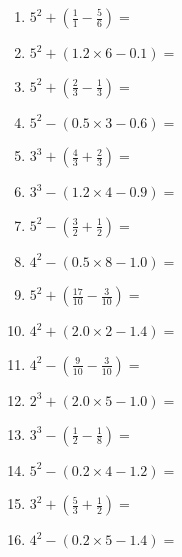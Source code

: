 \documentclass[12pt]{article}
\begin{document}
\begin{enumerate}
\item \large $ 5^{2} + (\frac{1}{1} - \frac{5}{6}) = $ \vspace{1.6cm}
\item \large $ 5^{2} + (1.2 \times 6 - 0.1) = $ \vspace{1.6cm}
\item \large $ 5^{2} + (\frac{2}{3} - \frac{1}{3}) = $ \vspace{1.6cm}
\item \large $ 5^{2} - (0.5 \times 3 - 0.6) = $ \vspace{1.6cm}
\item \large $ 3^{3} + (\frac{4}{3} + \frac{2}{3}) = $ \vspace{1.6cm}
\item \large $ 3^{3} - (1.2 \times 4 - 0.9) = $ \vspace{1.6cm}
\newpage
\item \large $ 5^{2} - (\frac{3}{2} + \frac{1}{2}) = $ \vspace{1.6cm}
\item \large $ 4^{2} - (0.5 \times 8 - 1.0) = $ \vspace{1.6cm}
\item \large $ 5^{2} + (\frac{17}{10} - \frac{3}{10}) = $ \vspace{1.6cm}
\item \large $ 4^{2} + (2.0 \times 2 - 1.4) = $ \vspace{1.6cm}
\item \large $ 4^{2} - (\frac{9}{10} - \frac{3}{10}) = $ \vspace{1.6cm}
\item \large $ 2^{3} + (2.0 \times 5 - 1.0) = $ \vspace{1.6cm}
\item \large $ 3^{3} - (\frac{1}{2} - \frac{1}{8}) = $ \vspace{1.6cm}
\item \large $ 5^{2} - (0.2 \times 4 - 1.2) = $ \vspace{1.6cm}
\item \large $ 3^{2} + (\frac{5}{3} + \frac{1}{2}) = $ \vspace{1.6cm}
\item \large $ 4^{2} - (0.2 \times 5 - 1.4) = $ \vspace{1.6cm}
\end{enumerate}\newpage
\end{document}
